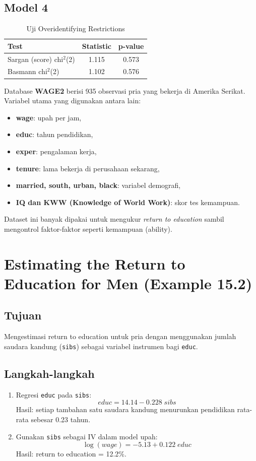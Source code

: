 \documentclass[]{article}
\begin{document}
\subsection*{Model 4}
\begin{table}[htbp]\centering
\caption{Uji Overidentifying Restrictions}
\begin{tabular}{lcc}
\toprule
\textbf{Test} & \textbf{Statistic} & \textbf{p-value} \\
\midrule
Sargan (score) chi$^2$(2) & 1.115 & 0.573 \\
Basmann chi$^2$(2)        & 1.102 & 0.576 \\
\bottomrule
\end{tabular}
\end{table}
Database \textbf{WAGE2} berisi 935 observasi pria yang bekerja di Amerika Serikat. 
Variabel utama yang digunakan antara lain:
\begin{itemize}
    \item \textbf{wage}: upah per jam,
    \item \textbf{educ}: tahun pendidikan,
    \item \textbf{exper}: pengalaman kerja,
    \item \textbf{tenure}: lama bekerja di perusahaan sekarang,
    \item \textbf{married, south, urban, black}: variabel demografi,
    \item \textbf{IQ dan KWW (Knowledge of World Work)}: skor tes kemampuan.
\end{itemize}
Dataset ini banyak dipakai untuk mengukur \textit{return to education} sambil mengontrol faktor-faktor seperti kemampuan (ability).

\section{Estimating the Return to Education for Men (Example 15.2)}
\subsection*{Tujuan}
Mengestimasi return to education untuk pria dengan menggunakan jumlah saudara kandung (\texttt{sibs}) sebagai variabel instrumen bagi \texttt{educ}.

\subsection*{Langkah-langkah}
\begin{enumerate}
    \item Regresi \texttt{educ} pada \texttt{sibs}:
    \[
    educ = 14.14 - 0.228 \; sibs
    \]
    Hasil: setiap tambahan satu saudara kandung menurunkan pendidikan rata-rata sebesar 0.23 tahun.
    \item Gunakan \texttt{sibs} sebagai IV dalam model upah:
    \[
    \log(wage) = -5.13 + 0.122 \; educ
    \]
    Hasil: return to education = 12.2\%.
\end{enumerate}
\end{document}

